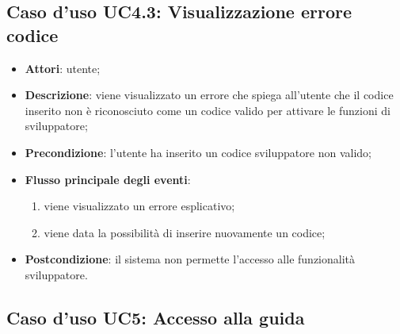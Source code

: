 \documentclass[../AnalisiDeiRequisiti.tex]{subfiles}
\begin{document}
\subsection{Caso d'uso UC4.3: Visualizzazione errore codice}
\begin{itemize}
\item \textbf{Attori}: utente;
\item \textbf{Descrizione}: viene visualizzato un errore che spiega all'utente che il codice inserito non è riconosciuto come un codice valido per attivare le funzioni di sviluppatore; 
      \item \textbf{Precondizione}: l'utente ha inserito un codice sviluppatore non valido;

        \item \textbf{Flusso principale degli eventi}:
          \begin{enumerate}
          \item viene visualizzato un errore esplicativo;
          \item viene data la possibilità di inserire nuovamente un codice;

      \end{enumerate}
    \item \textbf{Postcondizione}: il sistema non permette l'accesso alle funzionalità sviluppatore.
  \end{itemize}
\hypertarget{UC5}{}
\subsection{Caso d'uso UC5: Accesso alla guida}
\end{document}
